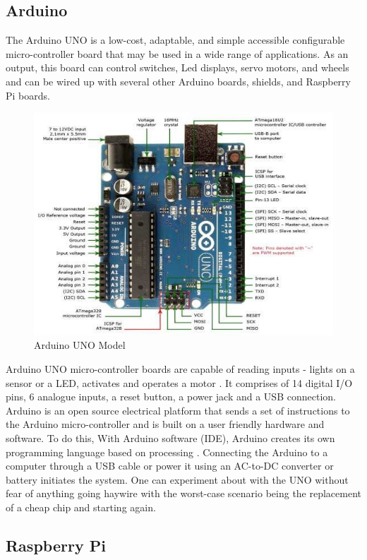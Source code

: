 \documentclass[conference,a4paper]{IEEEtran}
\begin{document}
\subsection{Arduino}
The Arduino UNO is a low-cost, adaptable, and simple accessible configurable micro-controller board that may be used in a wide range of applications. As an output, this board can control switches, Led displays, servo motors, and wheels and can be wired up with several other Arduino boards, shields, and Raspberry Pi boards.
\begin{figure}[ht]
\centering
\includegraphics[width=1\linewidth]{ArduinoUNO.jpg}
\caption{Arduino UNO Model}
\label{Fig: Model}
\end{figure}
Arduino UNO micro-controller boards are capable of reading inputs - lights on a sensor or a LED, activates and operates a motor \cite{5}. It comprises of 14 digital I/O pins, 6 analogue inputs, a reset button, a power jack and a USB connection. 
Arduino is an open source electrical platform that sends a set of instructions to the Arduino micro-controller and is built on a user friendly hardware and software. To do this, With Arduino software (IDE), Arduino creates its own programming language based on processing \cite{10}. 
Connecting the Arduino to a computer through a USB cable or power it using an AC-to-DC converter or battery initiates the system\cite{10}. One can experiment about with the UNO without fear of anything going haywire with the worst-case scenario being the replacement of a cheap chip and starting again.
\subsection{Raspberry Pi}
\end{document}
